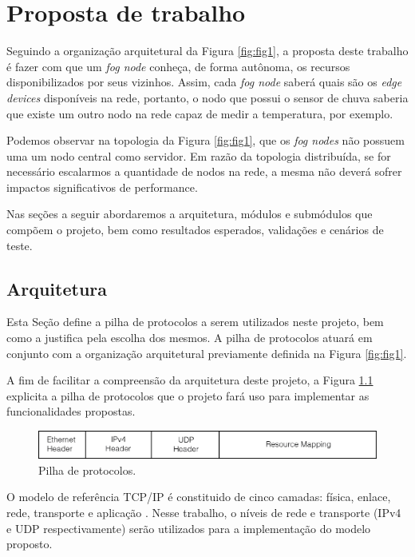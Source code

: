 \chapter{\label{chap:chap3} Proposta de trabalho}

Seguindo a organização arquitetural da Figura \ref{fig:fig1}, a proposta deste trabalho é fazer com que um \textit{fog node} conheça, de forma autônoma, os recursos disponibilizados por seus vizinhos.
Assim, cada \textit{fog node} saberá quais são os \textit{edge devices} disponíveis na rede, portanto,
o nodo que possui o sensor de chuva saberia que existe um outro nodo na rede capaz de medir a temperatura, por exemplo.


Podemos observar na topologia da Figura \ref{fig:fig1}, que os \textit{fog nodes} não possuem uma um nodo central como servidor.
Em razão da topologia distribuída, se for necessário escalarmos a quantidade de nodos na rede, a mesma não deverá sofrer impactos significativos de performance.

Nas seções a seguir abordaremos a arquitetura, módulos e submódulos que compõem o projeto, bem como resultados esperados, validações e cenários de teste. 

\section{Arquitetura}

Esta Seção define a pilha de protocolos a serem utilizados neste projeto, bem como a justifica pela escolha dos mesmos.
A pilha de protocolos atuará em conjunto com a organização arquitetural previamente definida na Figura \ref{fig:fig1}.

A fim de facilitar a compreensão da arquitetura deste projeto, a Figura \ref{fig:fig2} explicita a pilha de protocolos que o projeto fará uso para implementar as funcionalidades propostas.

\begin{figure}[htb!]
    \centering\includegraphics[width=.8\textwidth]{fig2.png}
    \caption%
    {\label{fig:fig2} Pilha de protocolos.}
\end{figure}

O modelo de referência TCP/IP é constituido de cinco camadas: física, enlace, rede, transporte e aplicação \cite{tanenbaum2011redes}.
Nesse trabalho, o níveis de rede e transporte (IPv4 e UDP respectivamente) serão utilizados para a implementação do modelo proposto.

